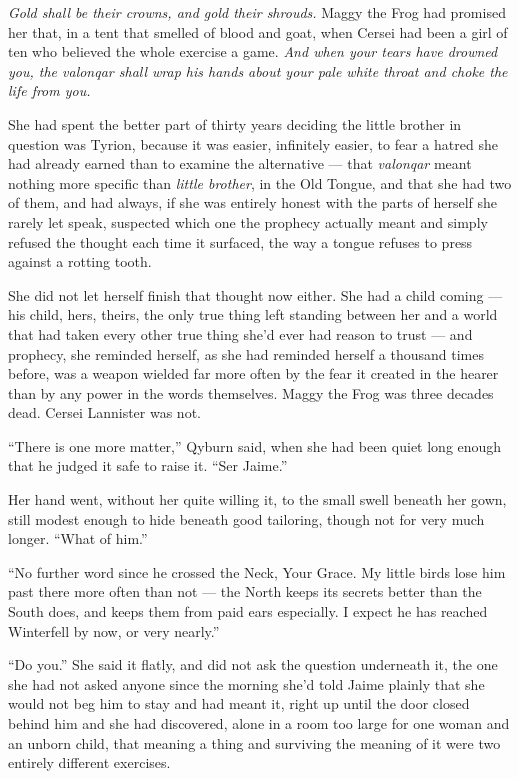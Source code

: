 \textit{Gold shall be their crowns, and gold their shrouds.} Maggy the Frog had promised her that, in a tent that smelled of blood and goat, when Cersei had been a girl of ten who believed the whole exercise a game. \textit{And when your tears have drowned you, the valonqar shall wrap his hands about your pale white throat and choke the life from you.}

She had spent the better part of thirty years deciding the little brother in question was Tyrion, because it was easier, infinitely easier, to fear a hatred she had already earned than to examine the alternative — that \textit{valonqar} meant nothing more specific than \textit{little brother}, in the Old Tongue, and that she had two of them, and had always, if she was entirely honest with the parts of herself she rarely let speak, suspected which one the prophecy actually meant and simply refused the thought each time it surfaced, the way a tongue refuses to press against a rotting tooth.

She did not let herself finish that thought now either. She had a child coming — his child, hers, theirs, the only true thing left standing between her and a world that had taken every other true thing she’d ever had reason to trust — and prophecy, she reminded herself, as she had reminded herself a thousand times before, was a weapon wielded far more often by the fear it created in the hearer than by any power in the words themselves. Maggy the Frog was three decades dead. Cersei Lannister was not.

“There is one more matter,” Qyburn said, when she had been quiet long enough that he judged it safe to raise it. “Ser Jaime.”

Her hand went, without her quite willing it, to the small swell beneath her gown, still modest enough to hide beneath good tailoring, though not for very much longer. “What of him.”

“No further word since he crossed the Neck, Your Grace. My little birds lose him past there more often than not — the North keeps its secrets better than the South does, and keeps them from paid ears especially. I expect he has reached Winterfell by now, or very nearly.”

“Do you.” She said it flatly, and did not ask the question underneath it, the one she had not asked anyone since the morning she’d told Jaime plainly that she would not beg him to stay and had meant it, right up until the door closed behind him and she had discovered, alone in a room too large for one woman and an unborn child, that meaning a thing and surviving the meaning of it were two entirely different exercises.

